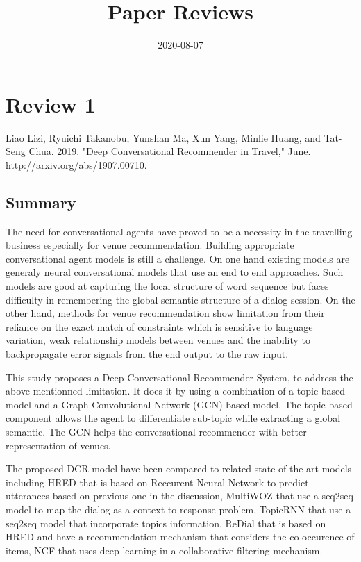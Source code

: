 \documentclass{article}
\begin{document}
\title{Paper Reviews}
\date{2020-08-07}
\maketitle

\section*{Review 1}
Liao Lizi, Ryuichi Takanobu, Yunshan Ma, Xun Yang, Minlie Huang, 
and Tat-Seng Chua. 2019. "Deep Conversational Recommender in Travel," 
June. http://arxiv.org/abs/1907.00710.

\subsection*{Summary}
The need for conversational agents have proved to be a necessity in the 
travelling business especially for venue recommendation. Building appropriate 
conversational agent models is still a challenge. On one hand existing models 
are generaly neural conversational models that use an end to end approaches. 
Such models are good at capturing the local structure of word sequence 
but faces difficulty in remembering the global semantic structure of a 
dialog session. On the other hand, methods for venue recommendation show
limitation from their reliance on the exact match of constraints which is 
sensitive to language variation, weak relationship models between venues 
and the inability to backpropagate error signals from the end output to 
the raw input.

This study proposes a Deep Conversational Recommender System, to address the 
above mentionned limitation. It does it by using a combination of a 
topic based model and a Graph Convolutional Network (GCN) based model. 
The topic based component allows the agent to differentiate sub-topic 
while extracting a global semantic. The GCN helps the conversational 
recommender with better representation of venues.

The proposed DCR model have been compared to related state-of-the-art 
models including HRED that is based on Reccurent Neural Network to 
predict utterances based on previous one in the discussion, MultiWOZ that 
use a seq2seq model to map the dialog as a context to response problem, 
TopicRNN that use a seq2seq model that incorporate topics information, 
ReDial that is based on HRED and have a recommendation mechanism that 
considers the co-occurence of items, NCF that uses deep learning in 
a collaborative filtering mechanism. 
\end{document}

